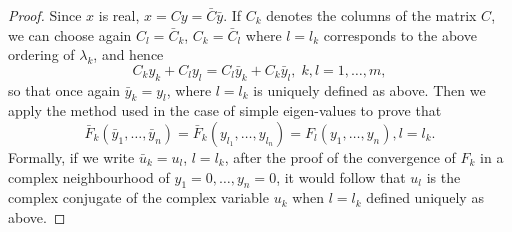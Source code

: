 \begin{proof}
Since $x$ is real, $x = Cy = \bar{C} \bar{y}$. If $C_k$ denotes the
columns of the matrix $C$, we can choose again $C_l = \bar{C}_k$, $C_k
= \bar{C}_l$ where $l=l_k$ corresponds to the above ordering of
$\lambda_k$, and hence 
$$
C_k y_k + C_l y_l = C_l \bar{y}_k + C_k \bar{y}_l, \;k , l =1,
\ldots,m, 
$$
so that once again $\bar{y}_k = y_l$, where $l=l_k$ is uniquely
defined as above. Then we apply the method used in the case of simple
eigen-values to prove that 
$$
\bar{F}_k (\bar{y}_1, \ldots, \bar{y}_n) = \bar{F}_k (y_{l_1}, \ldots,
y_{l_n}) = F_l (y_1, \ldots, y_n), l = l_k. 
$$
Formally, if we write $\bar{u}_k = u_l$, $l=l_k$, after the proof of
the convergence of $F_k$ in a complex neighbourhood of $y_1 = 0,
\ldots, y_n = 0$, it would follow that $u_l$ is the complex conjugate
of the complex variable $u_k$ when $l=l_k$ defined uniquely as above. 


\end{proof}
